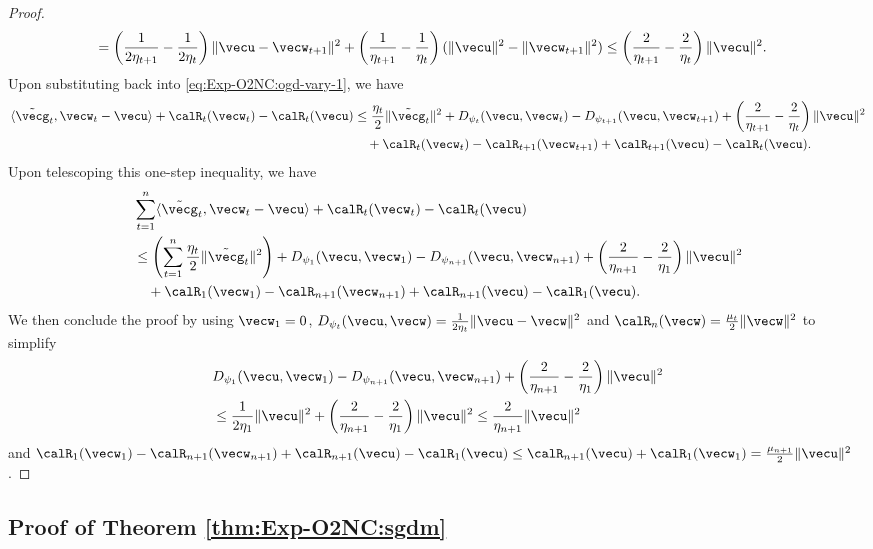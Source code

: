 \begin{proof}
\begin{align*}
    &= \left(\frac{1}{2\eta_{t+1}}-\frac{1}{2\eta_t}\right)\|\vecu-\vecw_{t+1}\|^2 + \left(\frac{1}{\eta_{t+1}}-\frac{1}{\eta_t}\right)(\|\vecu\|^2-\|\vecw_{t+1}\|^2) 
    \le \left(\frac{2}{\eta_{t+1}} - \frac{2}{\eta_t}\right)\|\vecu\|^2.
\end{align*}
Upon substituting back into \eqref{eq:Exp-O2NC:ogd-vary-1}, we have
\begin{align*}
    \langle \tilde\vecg_t, \vecw_t-\vecu\rangle + \calR_t(\vecw_t) - \calR_t(\vecu)
    &\le \frac{\eta_t}{2}\|\tilde\vecg_t\|^2 + D_{\psi_t}(\vecu,\vecw_t) - D_{\psi_{t+1}}(\vecu,\vecw_{t+1}) + \left(\frac{2}{\eta_{t+1}} - \frac{2}{\eta_t}\right)\|\vecu\|^2 \\
    &\quad + \calR_t(\vecw_t) - \calR_{t+1}(\vecw_{t+1}) + \calR_{t+1}(\vecu) - \calR_t(\vecu).
\end{align*}
Upon telescoping this one-step inequality, we have
\begin{align*}
    &\sum_{t=1}^n \langle \tilde\vecg_t, \vecw_t-\vecu\rangle + \calR_t(\vecw_t) - \calR_t(\vecu) \\
    &\le \left( \sum_{t=1}^n \frac{\eta_t}{2}\|\tilde\vecg_t\|^2 \right) + D_{\psi_1}(\vecu,\vecw_1) - D_{\psi_{n+1}}(\vecu,\vecw_{n+1}) + \left(\frac{2}{\eta_{n+1}} - \frac{2}{\eta_1}\right)\|\vecu\|^2 \\
    &\quad + \calR_1(\vecw_1) - \calR_{n+1}(\vecw_{n+1}) + \calR_{n+1}(\vecu) - \calR_1(\vecu).
\end{align*}
We then conclude the proof by using $\vecw_1=0$, $D_{\psi_t}(\vecu,\vecw)=\frac{1}{2\eta_t}\|\vecu-\vecw\|^2$ and $\calR_n(\vecw)=\frac{\mu_t}{2}\|\vecw\|^2$ to simplify
\begin{align*}
    & D_{\psi_1}(\vecu,\vecw_1) - D_{\psi_{n+1}}(\vecu,\vecw_{n+1}) + \left(\frac{2}{\eta_{n+1}} - \frac{2}{\eta_1}\right)\|\vecu\|^2 \\
    &\le \frac{1}{2\eta_1}\|\vecu\|^2 + \left(\frac{2}{\eta_{n+1}} - \frac{2}{\eta_1}\right)\|\vecu\|^2 \le \frac{2}{\eta_{n+1}}\|\vecu\|^2
\end{align*}
and $\calR_1(\vecw_1) - \calR_{n+1}(\vecw_{n+1}) + \calR_{n+1}(\vecu) - \calR_1(\vecu) \le \calR_{n+1}(\vecu) + \calR_1(\vecw_1) = \frac{\mu_{n+1}}{2}\|\vecu\|^2$.
\end{proof}


\subsection{Proof of Theorem \ref{thm:Exp-O2NC:sgdm}}

